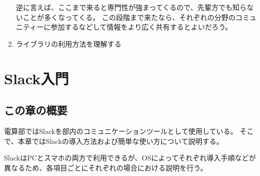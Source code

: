 \documentclass[lualatex,ja=standard,12pt,a4j]{bxjsbook}
\begin{document}
\begin{enumerate}
                逆に言えば、ここまで来ると専門性が強まってくるので、先輩方でも知らないことが多くなってくる。
                この段階まで来たなら、それぞれの分野のコミュニティーに参加するなどして情報をより広く共有するとよいだろう。
				
				\item ライブラリの利用方法を理解する\\
                
			\end{enumerate}
	\chapter{Slack入門}
		\section{この章の概要}
			電算部ではSlackを部内のコミュニケーションツールとして使用している。
            そこで、本章ではSlackの導入方法および簡単な使い方について説明する。
            
            SlackはPCとスマホの両方で利用できるが、OSによってそれぞれ導入手順などが異なるため、各項目ごとにそれぞれの場合における説明を行う。
\end{document}
